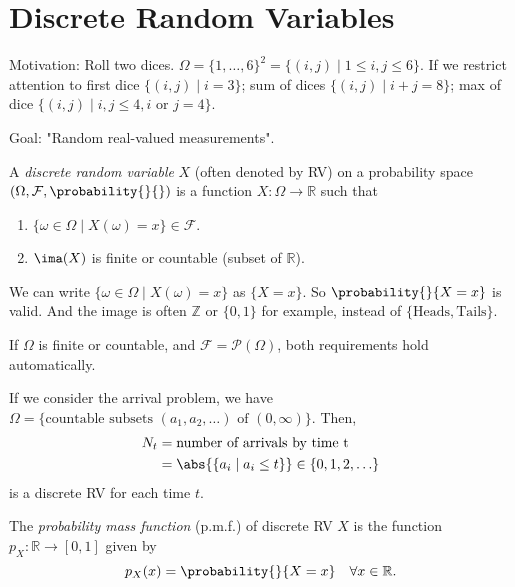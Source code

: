 \section{Discrete Random Variables}
Motivation: Roll two dices. \(\Omega=\{1, \ldots,6\}^2 = \{(i,j)\mid 1\leq i,j \leq 6\}\). If we restrict attention to first dice \(\{(i,j)\mid i = 3\}\); sum of dices \(\{(i,j) \mid i + j = 8\}\); max of dice \(\{(i,j)\mid i,j \leq 4, i\text{ or }j=4\}\).

Goal: "Random real-valued measurements".

\begin{definition}{}{}
    A \textit{discrete random variable} \(X\) (often denoted by RV) on a probability space \((\Omega, \mathcal{F}, \probability{}{})\) is a function \(X: \Omega\to \mathbb{R}\) such that
    \begin{enumerate}
        \item \(\{\omega \in \Omega\mid X(\omega) = x\}\in \mathcal{F} \).
        \item \(\ima(X)\) is finite or countable (subset of \(\mathbb{R}\)).
    \end{enumerate}
    We can write \(\{\omega \in \Omega\mid X(\omega) = x\}\) as \(\{X = x\}\). So \(\probability{}{X=x} \) is valid. And the image is often \(\mathbb{Z}\) or \(\{0,1\}\) for example, instead of \(\{\text{Heads}, \text{Tails}\}\).

    If \(\Omega\) is finite or countable, and \(\mathcal{F}=\mathcal{P} (\Omega)\), both requirements hold automatically.
\end{definition}
\begin{example}
    If we consider the arrival problem, we have \(\Omega=\{\text{countable subsets } (a_1,a_2, \ldots) \text{ of }(0, \infty)\}\). Then,
    \begin{align*}
        N_t &= \text{number of arrivals by time t}\\
        &= \abs{\{a_i \mid a_i \leq t\}} \in \{0,1,2, \ldots\}
    \end{align*}
    is a discrete RV for each time \(t\).
\end{example}
\begin{definition}{}{}
    The \textit{probability mass function} (p.m.f.) of discrete RV \(X\) is the function \(p_X:\mathbb{R} \to [0,1]\) given by
    \[
        p_X(x) = \probability{}{X = x}\quad \forall x \in \mathbb{R}.
    \]
\end{definition}
